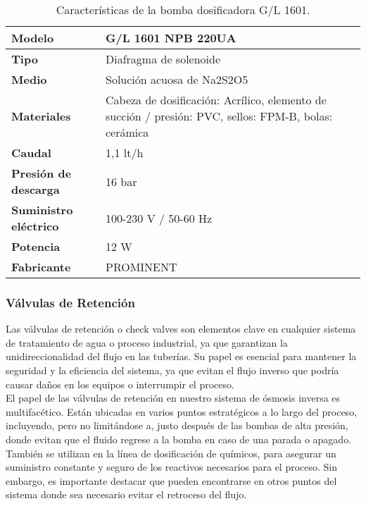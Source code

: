 

\begin{table}[H]
    \centering
    \caption{Características de la bomba dosificadora G/L 1601.}
    \label{table:bomba_dosificadora2}
    \begin{tabular}{| L{6cm} | L{6cm} |}
        \hline
        \textbf{Modelo} & G/L 1601 NPB 220UA  \\
        \hline
        \textbf{Tipo} & Diafragma de solenoide \\
        \hline
        \textbf{Medio} & Solución acuosa de Na2S2O5 \\
        \hline
        \textbf{Materiales} & Cabeza de dosificación: Acrílico, elemento de succión / presión: PVC, sellos: FPM-B, bolas: cerámica \\
        \hline
        \textbf{Caudal} & 1,1 lt/h \\
        \hline
        \textbf{Presión de descarga} & 16 bar \\
        \hline
        \textbf{Suministro eléctrico} & 100-230 V / 50-60 Hz \\
        \hline
        \textbf{Potencia} & 12 W \\
        \hline
        \textbf{Fabricante} & PROMINENT \\
        \hline
    \end{tabular}
\end{table}


\subsubsection{Válvulas de Retención} \label{sec:valvula_retencion}

Las válvulas de retención o check valves son elementos clave en cualquier sistema de tratamiento de agua o proceso industrial, ya que garantizan la unidireccionalidad del flujo en las tuberías. Su papel es esencial para mantener la seguridad y la eficiencia del sistema, ya que evitan el flujo inverso que podría causar daños en los equipos o interrumpir el proceso.\\

El papel de las válvulas de retención en nuestro sistema de ósmosis inversa es multifacético. Están ubicadas en varios puntos estratégicos a lo largo del proceso, incluyendo, pero no limitándose a, justo después de las bombas de alta presión, donde evitan que el fluido regrese a la bomba en caso de una parada o apagado. También se utilizan en la línea de dosificación de químicos, para asegurar un suministro constante y seguro de los reactivos necesarios para el proceso. Sin embargo, es importante destacar que pueden encontrarse en otros puntos del sistema donde sea necesario evitar el retroceso del flujo.\\

